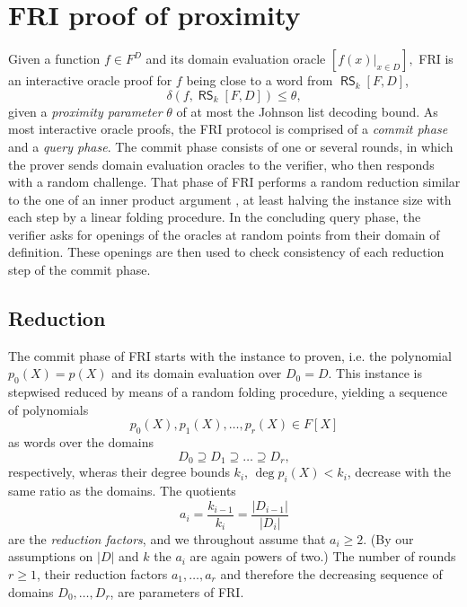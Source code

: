 \documentclass[11pt]{article}
\theoremstyle{definition}
\theoremstyle{remark}
\DeclareMathOperator{\RS}{\mathsf{RS}}
\begin{document}
\section{FRI proof of proximity}

Given a function $f\in F^D$ and its  domain evaluation oracle 
$
[f(x)|_{x\in D}],
$ 
FRI is an interactive oracle proof for $f$ being close to a word from $\RS_k[F,D]$, 
\[
\delta( f, \RS_k[F,D]) \leq \theta,
\]
given a \textit{proximity parameter} $\theta$ of at most the Johnson list decoding bound. %
%
As most interactive oracle proofs, the FRI protocol is comprised of a \textit{commit phase} and a \textit{query phase}.
The commit phase consists of one or several rounds, in which the prover sends domain evaluation oracles to the verifier, who then responds with a random challenge.
That phase of FRI performs a random reduction similar to the one of an inner product argument \cite{BootleGroth}, at least halving the instance size with each step by a linear folding procedure.
In the concluding query phase, the verifier asks for openings of the oracles at random points from their domain of definition. 
These openings are then used to check consistency of each reduction step of the commit phase.


\subsection{Reduction}


The commit phase of FRI starts with the instance to proven, i.e. the polynomial $p_0(X)=p(X)$ and its domain evaluation over $D_0=D$.
This instance is stepwised reduced by means of a random folding procedure, yielding a sequence of polynomials 
\[
p_0(X), p_1(X), \ldots , p_r(X)\in  F[X]
\]
as words over the domains 
\[
D_0\supseteq D_1\supseteq \ldots\supseteq D_r,
\]
respectively, wheras their degree bounds $k_i$, $\deg p_i(X) < k_i$, decrease with the same ratio as the domains.
The quotients 
\[
a_i = \frac{k_{i-1}}{k_i} = \frac{|D_{i-1}|}{|D_i|} 
\]
are the \textit{reduction factors}, and we throughout assume that $a_i\geq 2$. (By our assumptions on $|D|$ and $k$ the $a_i$ are again powers of two.)
The number of rounds $r\geq 1$,  their reduction factors $a_1,\ldots, a_r$ and therefore the decreasing sequence of domains $D_0,\ldots, D_r$, are parameters of FRI.
\end{document}
